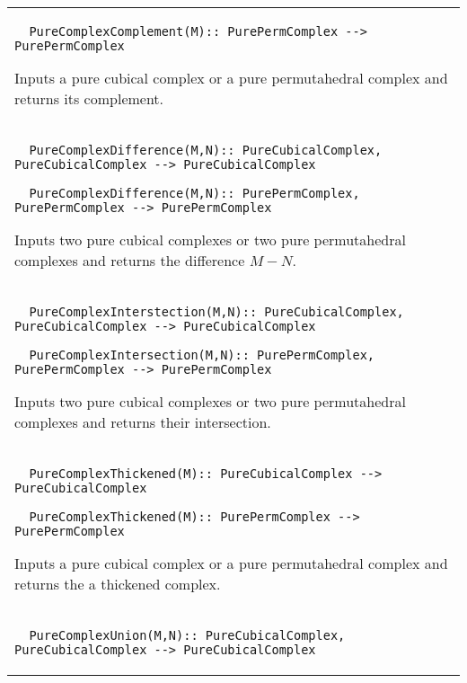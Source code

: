 \documentclass[a4paper,11pt]{report}
\begin{document}
{\begin{center}
\begin{tabular}{|l|}
\begin{verbatim}  PureComplexComplement(M):: PurePermComplex --> PurePermComplex
\end{verbatim}


 

 Inputs a pure cubical complex or a pure permutahedral complex and returns its
complement. \\
 \index{PureComplexDifference} 
\begin{verbatim}  PureComplexDifference(M,N):: PureCubicalComplex, PureCubicalComplex --> PureCubicalComplex
\end{verbatim}
 
\begin{verbatim}  PureComplexDifference(M,N):: PurePermComplex, PurePermComplex --> PurePermComplex
\end{verbatim}


 

 Inputs two pure cubical complexes or two pure permutahedral complexes and
returns the difference $ M - N$. \\
 \index{PureComplexIntersection} 
\begin{verbatim}  PureComplexInterstection(M,N):: PureCubicalComplex, PureCubicalComplex --> PureCubicalComplex
\end{verbatim}
 
\begin{verbatim}  PureComplexIntersection(M,N):: PurePermComplex, PurePermComplex --> PurePermComplex
\end{verbatim}


 

 Inputs two pure cubical complexes or two pure permutahedral complexes and
returns their intersection. \\
 \index{PureComplexThickened} 
\begin{verbatim}  PureComplexThickened(M):: PureCubicalComplex --> PureCubicalComplex
\end{verbatim}
 
\begin{verbatim}  PureComplexThickened(M):: PurePermComplex --> PurePermComplex
\end{verbatim}


 

 Inputs a pure cubical complex or a pure permutahedral complex and returns the
a thickened complex. \\
 \index{PureComplexUnion} 
\begin{verbatim}  PureComplexUnion(M,N):: PureCubicalComplex, PureCubicalComplex --> PureCubicalComplex
\end{verbatim}
 

\end{tabular}
\end{center}}
\end{document}
